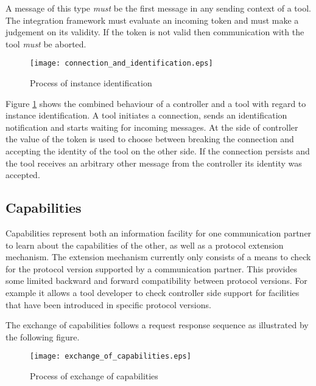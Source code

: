 \documentclass{article}
\begin{document}
   \noindent A message of this type \emph{must} be the first message in any
   sending context of a tool. The integration framework must evaluate an incoming
   token and must make a judgement on its validity. If the token is not valid
   then communication with the tool \emph{must} be aborted.

   \begin{figure}[H]
    \begin{center}
     \texttt{[image: connection\_and\_identification.eps]}
    \end{center}
    \vspace{-0.3cm}
    \caption{Process of instance identification}
    \label{fig::identification}
   \end{figure}

   \noindent Figure \ref{fig::identification} shows the combined behaviour of a
   controller and a tool with regard to instance identification. A tool
   initiates a connection, sends an identification notification and starts
   waiting for incoming messages.  At the side of controller the value of the
   token is used to choose between breaking the connection and accepting the
   identity of the tool on the other side. If the connection persists and the
   tool receives an arbitrary other message from the controller its identity
   was accepted.

  \subsection{Capabilities}

   Capabilities represent both an information facility for one communication
   partner to learn about the capabilities of the other, as well as a protocol
   extension mechanism. The extension mechanism currently only consists of a
   means to check for the protocol version supported by a communication
   partner. This provides some limited backward and forward compatibility
   between protocol versions.  For example it allows a tool developer to check
   controller side support for facilities that have been introduced in specific
   protocol versions.
   
   \noindent The exchange of capabilities follows a request response sequence
   as illustrated by the following figure.
   
   \begin{figure}[H]
    \begin{center}
     \texttt{[image: exchange\_of\_capabilities.eps]}
    \end{center}
    \vspace{-0.3cm}
    \caption{Process of exchange of capabilities}
   \end{figure}
\end{document}
